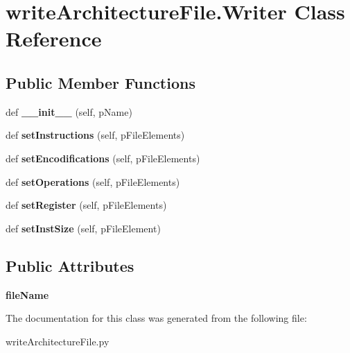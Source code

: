 \hypertarget{classwriteArchitectureFile_1_1Writer}{}\section{write\+Architecture\+File.\+Writer Class Reference}
\label{classwriteArchitectureFile_1_1Writer}
\subsection*{Public Member Functions}
\begin{DoxyCompactItemize}
\item 
def {\bfseries \+\_\+\+\_\+init\+\_\+\+\_\+} (self, p\+Name)\hypertarget{classwriteArchitectureFile_1_1Writer_aacdccf83d6bd4f6619a5d42011883f21}{}\label{classwriteArchitectureFile_1_1Writer_aacdccf83d6bd4f6619a5d42011883f21}

\item 
def {\bfseries set\+Instructions} (self, p\+File\+Elements)\hypertarget{classwriteArchitectureFile_1_1Writer_adfc4f6808305cb72ec7f8ba6cf0a3bd6}{}\label{classwriteArchitectureFile_1_1Writer_adfc4f6808305cb72ec7f8ba6cf0a3bd6}

\item 
def {\bfseries set\+Encodifications} (self, p\+File\+Elements)\hypertarget{classwriteArchitectureFile_1_1Writer_a2f55b4742d69c9cd5a0f461b18cab279}{}\label{classwriteArchitectureFile_1_1Writer_a2f55b4742d69c9cd5a0f461b18cab279}

\item 
def {\bfseries set\+Operations} (self, p\+File\+Elements)\hypertarget{classwriteArchitectureFile_1_1Writer_a584753df0d5d0904df53b8c870293335}{}\label{classwriteArchitectureFile_1_1Writer_a584753df0d5d0904df53b8c870293335}

\item 
def {\bfseries set\+Register} (self, p\+File\+Elements)\hypertarget{classwriteArchitectureFile_1_1Writer_a54ce0b08a6417a7023548fb7e39c5656}{}\label{classwriteArchitectureFile_1_1Writer_a54ce0b08a6417a7023548fb7e39c5656}

\item 
def {\bfseries set\+Inst\+Size} (self, p\+File\+Element)\hypertarget{classwriteArchitectureFile_1_1Writer_adbcaffd1add5429f979cb7b9b69ed951}{}\label{classwriteArchitectureFile_1_1Writer_adbcaffd1add5429f979cb7b9b69ed951}

\end{DoxyCompactItemize}
\subsection*{Public Attributes}
\begin{DoxyCompactItemize}
\item 
{\bfseries file\+Name}\hypertarget{classwriteArchitectureFile_1_1Writer_ad1456fce6a5798d571f55c6a9865758e}{}\label{classwriteArchitectureFile_1_1Writer_ad1456fce6a5798d571f55c6a9865758e}

\end{DoxyCompactItemize}


The documentation for this class was generated from the following file\+:\begin{DoxyCompactItemize}
\item 
write\+Architecture\+File.\+py\end{DoxyCompactItemize}

